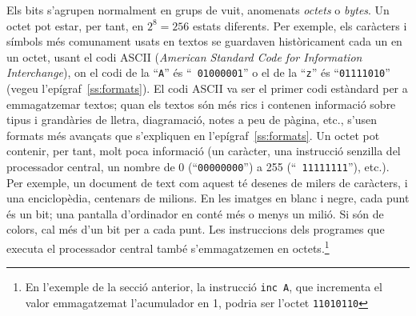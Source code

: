 Els bits s'agrupen normalment en grups de vuit, anomenats {\em octets}
o \emph{bytes}. Un octet pot estar, per tant, en $2^8=256$ estats
diferents. Per exemple, els caràcters i símbols més comunament usats
en textos se guardaven històricament cada un en un octet, usant el
codi ASCII\label{pg:ASCII} (\emph{American Standard Code for
  Information Interchange}), on el codi de la ``{\tt A}'' és ``{\tt
  01000001}'' o el de la ``{\tt z}'' és ``{\tt 01111010}'' (vegeu
l'epígraf~\ref{ss:formats}).  El codi ASCII va ser el primer codi
estàndard per a emmagatzemar textos; quan els textos són més rics i
contenen informació sobre tipus i grandàries de lletra, diagramació,
notes a peu de pàgina, etc., s'usen formats més avançats que
s'expliquen en l'epígraf~\ref{ss:formats}.  Un octet pot contenir, per
tant, molt poca informació (un caràcter, una instrucció senzilla del
processador central, un nombre de 0 (``{\tt 00000000}'') a 255 (``{\tt
  11111111}''), etc.).  Per exemple, un document de text com aquest té
desenes de milers de caràcters, i una enciclopèdia, centenars de
milions. En les imatges en blanc i negre, cada punt és un bit; una
pantalla d'ordinador en conté més o menys un milió. Si són de colors,
cal més d'un bit per a cada punt. Les instruccions dels programes que
executa el processador central també s'emmagatzemen en
octets.\footnote{En l'exemple de la secció anterior, la instrucció
  {\tt inc A}, que incrementa el valor emmagatzemat l'acumulador en 1,
  podria ser l'octet {\tt 11010110}}

